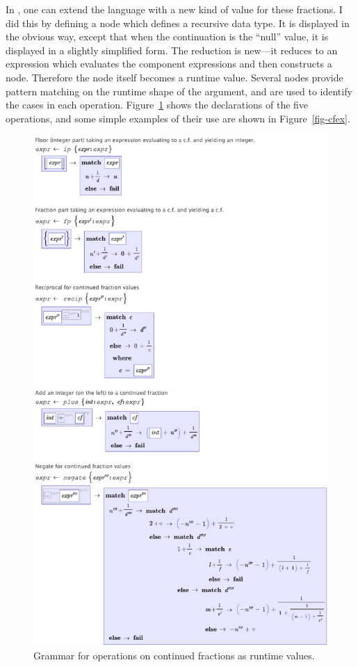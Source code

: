 In \Meta, one can extend the language with a new kind of value for these fractions. I did this by defining a  node which defines a recursive data type. It is displayed in the obvious way, except that when the continuation is the ``null'' value, it is displayed in a slightly simplified form. The  reduction is new---it reduces to an expression which evaluates the component expressions and then constructs a node. Therefore the node itself becomes a runtime value. Several  nodes provide pattern matching on the runtime shape of the argument, and are used to identify the cases in each operation. Figure~\ref{fig-cf} shows the declarations of the five operations, and some simple examples of their use are shown in Figure~\ref{fig-cfex}.
\begin{figure}[th]
  \centering
  
  
  \includegraphics[scale=0.5]{src/image/continued-ops.pdf}
  
  \caption{Grammar for operations on continued fractions as runtime values.}
  \label{fig-cf}
\end{figure}

